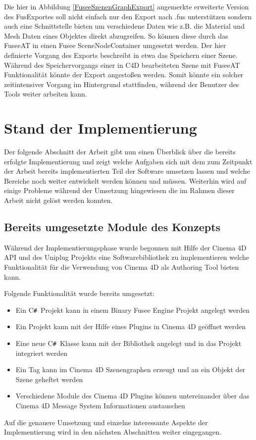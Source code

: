 \documentclass[pagesize, paper=a4, fontsize=12pt, titlepage=true, headings=small, headnosepline, abstractoff, liststotoc, nochapterprefix, plainheadsepline, twoside]{scrreprt}
\newcommand{\CSS}{C\texttt{\# }}
\begin{document}
Die hier in Abbildung \ref{FuseeSzenenGraphExport} angemerkte erweiterte Version des FusExportes soll nicht einfach nur den Export nach .fus unterstützen sondern auch eine Schnittstelle bieten um verschiedene Daten wie z.B. die Material und Mesh Daten eines Objektes direkt abzugreifen. So können diese durch das FuseeAT in einen Fusee SceneNodeContainer umgesetzt werden.
Der hier definierte Vorgang des Exports beschreibt in etwa das Speichern einer Szene. Während des Speichervorgangs einer in C4D bearbeiteten Szene mit FuseeAT Funktionalität könnte der Export angestoßen werden. Somit könnte ein solcher zeitintensiver Vorgang im Hintergrund stattfinden, während der Benutzer des Tools weiter arbeiten kann.

\section{Stand der Implementierung}
Der folgende Abschnitt der Arbeit gibt nun einen Überblick über die bereits erfolgte Implementierung und zeigt welche Aufgaben sich mit dem zum Zeitpunkt der Arbeit bereits implementierten Teil der Software umsetzen lassen und welche Bereiche noch weiter entwickelt werden können und müssen. Weiterhin wird auf einige Probleme während der Umsetzung hingewiesen die im Rahmen dieser Arbeit nicht gelöst werden konnten.

\subsection{Bereits umgesetzte Module des Konzepts}
Während der Implementierungsphase wurde begonnen mit Hilfe der Cinema 4D API und des Uniplug Projekts eine Softwarebibliothek zu implementieren welche Funktionalität für die Verwendung von Cinema 4D als Authoring Tool bieten kann. 

Folgende Funktionalität wurde bereits umgesetzt:
\begin{itemize}
\item Ein \CSS Projekt kann in einem Binary Fusee Engine Projekt angelegt werden
\item Ein Projekt kann mit der Hilfe eines Plugins in Cinema 4D geöffnet werden
\item Eine neue \CSS Klasse kann mit der Bibliothek angelegt und in das Projekt integriert werden
\item Ein Tag kann im Cinema 4D Szenengraphen erzeugt und an ein Objekt der Szene geheftet werden
\item Verschiedene Module des Cinema 4D Plugins können untereinander über das Cinema 4D Message System Informationen austauschen
\end{itemize}
Auf die genauere Umsetzung und einzelne interessante Aspekte der Implementierung wird in den nächsten Abschnitten weiter eingegangen.
\end{document}
